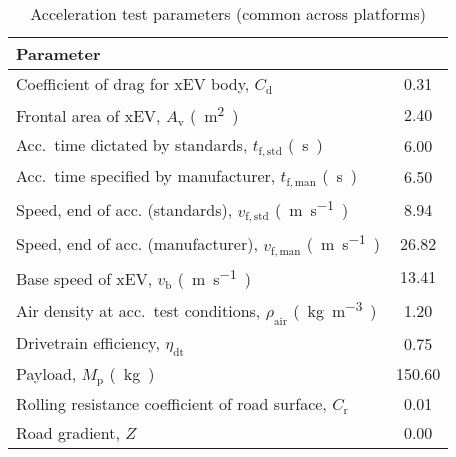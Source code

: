 

\begin{table}[!htbp]
	\centering
	\caption{Acceleration test parameters (common across  platforms)}
	\label{tbl:CommonVehicleParams}
	\begin{threeparttable}[t]
		\centering
		\begin{tabular*}{0.675\textwidth}{@{} l @{\extracolsep{\fill}}  S @{}}
			\toprule
			Parameter \\
			\midrule

			Coefficient of drag for xEV body, $C_\mathrm{d}$                           &  0.31    \\
			Frontal area of xEV, $A_\mathrm{v}$ \si{(m^2)}                             &  2.40    \\
			Acc.\ time dictated by standards, $t_\mathrm{f,std}$ \si{(s)}              &  6.00    \\
			Acc.\ time specified by manufacturer, $t_\mathrm{f,man}$ \si{(s)}          &  6.50    \\
			Speed, end of acc. (standards), $v_\mathrm{f,std}$ \si{(m.s^{-1})}         &  8.94    \\
			Speed, end of acc. (manufacturer), $v_\mathrm{f,man}$ \si{(m.s^{-1})}      &  26.82   \\
			Base speed of  xEV, $v_\mathrm{b}$ \si{(m.s^{-1})}                         &  13.41   \\
			Air density at acc.\ test conditions, $\rho_\mathrm{air}$ \si{(kg.m^{-3})} &  1.20    \\
			Drivetrain efficiency, $\eta_\mathrm{dt}$                                  &  0.75    \\
			Payload, $M_\mathrm{p}$ \si{(kg)}                                          &  150.60  \\
			Rolling resistance coefficient of road surface, $C_\mathrm{r}$             &  0.01    \\
			Road gradient, $Z$                                                         &  0.00    \\


\end{tabular*}
\end{threeparttable}
\end{table}
